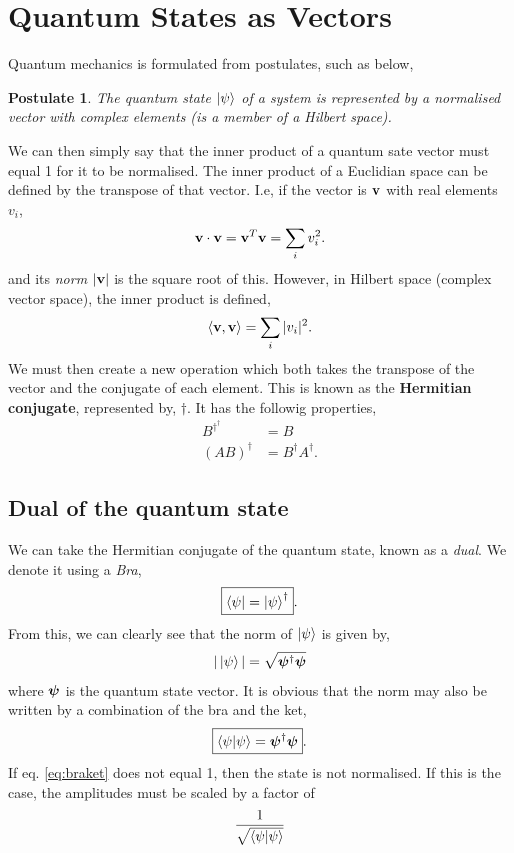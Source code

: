 \documentclass{book}
\newtheorem{postulate}{\textbf{Postulate}}
\begin{document}
\section{Quantum States as Vectors}
Quantum mechanics is formulated from postulates, such as below,
\begin{postulate}
	The quantum state $\ket{\psi}$ of a system is represented by a normalised vector with complex elements (is a member of a Hilbert space).
\end{postulate}\noindent
We can then simply say that the inner product of a quantum sate vector must equal 1 for it to be normalised. The inner product of a Euclidian space can be defined by the transpose of that vector. I.e, if the vector is $\vb{v}$ with real elements $v_i$,
\begin{equation}
	\vb{v}\cdot\vb{v} = \vb{v}^T\vb{v} = \sum_i v_i^2.
\end{equation}
and its \textit{norm} $|\vb{v}|$ is the square root of this. However, in Hilbert space (complex vector space), the inner product is defined,
\begin{equation}
	\left<\vb{v}, \vb{v}\right> = \sum_i |v_i|^2.
\end{equation}
We must then create a new operation which both takes the transpose of the vector and the conjugate of each element. This is known as the \textbf{Hermitian conjugate}, represented by, $\dag$. It has the followig properties,
\begin{align}
	B^{\dag^{\dag}} & = B\\
	(AB)^{\dag} & = B^{\dag}A^{\dag}.
\end{align}
\subsection{Dual of the quantum state}
We can take the Hermitian conjugate of the quantum state, known as a \textit{dual}. We denote it using a \textit{Bra},
\begin{equation}
	\boxed{\bra{\psi} = \ket{\psi}^{\dag}}.
\end{equation}
From this, we can clearly see that the norm of $\ket{\psi}$ is given by,
\begin{equation}
	|\ket{\psi}| = \sqrt{\vb*{\psi}^{\dag}\vb*{\psi}}
\end{equation}
where $\vb*{\psi}$ is the quantum state vector. It is obvious that the norm may also be written by a combination of the bra and the ket,
\begin{equation}
	\boxed{\braket{\psi}{\psi} =  \vb*{\psi}^{\dag}\vb*{\psi}}. \label{eq:braket}
\end{equation}
If eq. \eqref{eq:braket} does not equal 1, then the state is not normalised. If this is the case, the amplitudes must be scaled by a factor of $$\frac{1}{\sqrt{\braket{\psi}{\psi}}}$$
\end{document}
